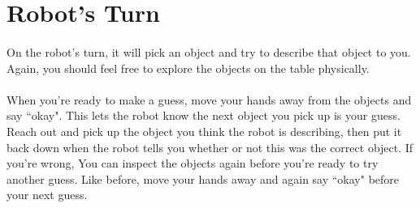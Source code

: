 \documentclass{article}
\begin{document}
\section {Robot's Turn}

\paragraph{} On the robot's turn, it will pick an object and try to describe that object to you. Again, you should feel free to explore the objects on the table physically.

\paragraph{} When you're ready to make a guess, move your hands away from the objects and say ``okay". This lets the robot know the next object you pick up is your guess. Reach out and pick up the object you think the robot is describing, then put it back down when the robot tells you whether or not this was the correct object. If you're wrong, You can inspect the objects again before you're ready to try another guess. Like before, move your hands away and again say ``okay" before your next guess. 
\end{document}
